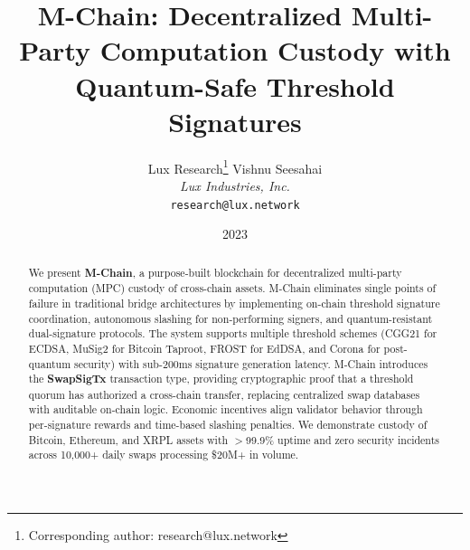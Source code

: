 \documentclass[11pt]{article}
\title{M-Chain: Decentralized Multi-Party Computation Custody with Quantum-Safe Threshold Signatures}
\author{
Lux Research\thanks{Corresponding author: research@lux.network}
\quad
Vishnu Seesahai\\
\textit{Lux Industries, Inc.}\\
\texttt{research@lux.network}
}
\date{2023}
\begin{document}
\luxcoverpage

\begin{abstract}
We present \textbf{M-Chain}, a purpose-built blockchain for decentralized multi-party computation (MPC) custody of cross-chain assets. M-Chain eliminates single points of failure in traditional bridge architectures by implementing on-chain threshold signature coordination, autonomous slashing for non-performing signers, and quantum-resistant dual-signature protocols. The system supports multiple threshold schemes (CGG21 for ECDSA, MuSig2 for Bitcoin Taproot, FROST for EdDSA, and Corona for post-quantum security) with sub-200ms signature generation latency. M-Chain introduces the \textbf{SwapSigTx} transaction type, providing cryptographic proof that a threshold quorum has authorized a cross-chain transfer, replacing centralized swap databases with auditable on-chain logic. Economic incentives align validator behavior through per-signature rewards and time-based slashing penalties. We demonstrate custody of Bitcoin, Ethereum, and XRPL assets with $>$99.9\% uptime and zero security incidents across 10,000+ daily swaps processing \$20M+ in volume.
\end{abstract}














\end{document}
